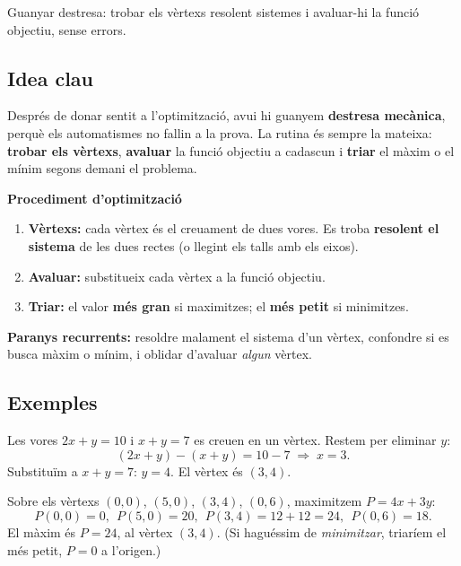 %
{Guanyar destresa: trobar els vèrtexs resolent sistemes i avaluar-hi la funció objectiu, sense errors.}

\subsection{Idea clau}

Després de donar sentit a l'optimització, avui hi guanyem \textbf{destresa mecànica},
perquè els automatismes no fallin a la prova. La rutina és sempre la mateixa:
\textbf{trobar els vèrtexs}, \textbf{avaluar} la funció objectiu a cadascun i
\textbf{triar} el màxim o el mínim segons demani el problema.

\begin{idea}
\textbf{Procediment d'optimització}
\begin{enumerate}[leftmargin=1.6em, itemsep=2pt]
  \item \textbf{Vèrtexs:} cada vèrtex és el creuament de dues vores. Es troba
        \textbf{resolent el sistema} de les dues rectes (o llegint els talls amb els
        eixos).
  \item \textbf{Avaluar:} substitueix cada vèrtex a la funció objectiu.
  \item \textbf{Triar:} el valor \textbf{més gran} si maximitzes; el \textbf{més petit}
        si minimitzes.
\end{enumerate}
\textbf{Paranys recurrents:} resoldre malament el sistema d'un vèrtex, confondre si es
busca màxim o mínim, i oblidar d'avaluar \emph{algun} vèrtex.
\end{idea}

\subsection{Exemples}

\begin{exemple}
Les vores $2x+y=10$ i $x+y=7$ es creuen en un vèrtex. Restem per eliminar $y$:
\[
(2x+y)-(x+y)=10-7 \;\Rightarrow\; x=3.
\]
Substituïm a $x+y=7$: $y=4$. El vèrtex és $(3,4)$.
\end{exemple}

\begin{exemple}
Sobre els vèrtexs $(0,0)$, $(5,0)$, $(3,4)$, $(0,6)$, maximitzem $P=4x+3y$:
\[
P(0,0)=0,\ \ P(5,0)=20,\ \ P(3,4)=12+12=24,\ \ P(0,6)=18.
\]
El màxim és $P=24$, al vèrtex $(3,4)$. (Si haguéssim de \emph{minimitzar}, triaríem el
més petit, $P=0$ a l'origen.)
\end{exemple}

